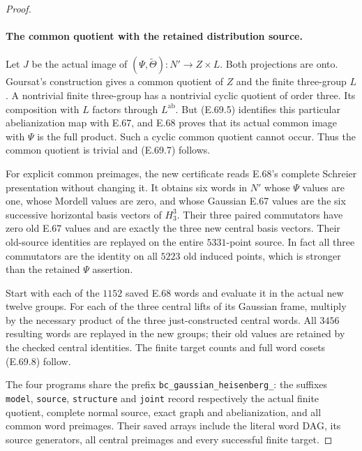 \begin{proof}
\paragraph{The common quotient with the retained distribution source.}
Let $J$ be the actual image of
$(\Psi,\widetilde\Theta):N'\to Z\times L$.
Both projections are onto. Goursat's construction
gives a common quotient of $Z$ and the finite
three-group $L$. A nontrivial finite three-group has
a nontrivial cyclic quotient of order three. Its
composition with $L$ factors through $L^{\mathrm{ab}}$.
But (E.69.5) identifies this particular abelianization
map with E.67, and E.68 proves that its actual common
image with $\Psi$ is the full product. Such a cyclic
common quotient cannot occur. Thus the common quotient
is trivial and (E.69.7) follows.

For explicit common preimages, the new certificate
reads E.68's complete Schreier presentation without
changing it. It obtains six words in $N'$ whose
$\Psi$ values are one, whose Mordell values are zero,
and whose Gaussian E.67 values are the six successive
horizontal basis vectors of $H_3^3$. Their three
paired commutators have zero old E.67 values and are
exactly the three new central basis vectors. Their
old-source identities are replayed on the entire
$5331$-point source. In fact all three commutators
are the identity on all $5223$ old induced points,
which is stronger than the retained $\Psi$ assertion.

Start with each of the $1152$ saved E.68 words and
evaluate it in the actual new twelve groups. For
each of the three central lifts of its Gaussian
frame, multiply by the necessary product of the
three just-constructed central words. All $3456$
resulting words are replayed in the new groups;
their old values are retained by the checked
central identities. The finite target counts
and full word cosets (E.69.8) follow.

The four programs share the prefix
\texttt{bc\_gaussian\_heisenberg\_}: the suffixes
\texttt{model}, \texttt{source}, \texttt{structure}
and \texttt{joint} record respectively the actual
finite quotient, complete normal source, exact
graph and abelianization, and all common word
preimages. Their saved arrays include the literal
word DAG, its source generators, all central
preimages and every successful finite target.
\end{proof}
